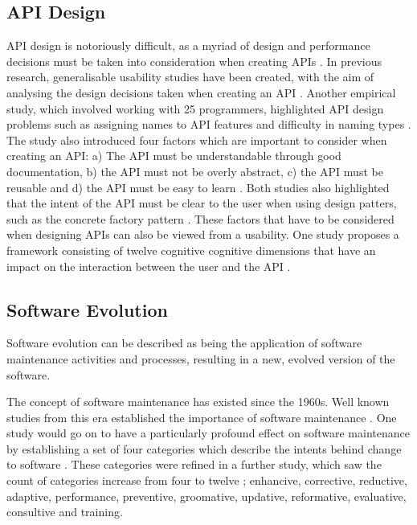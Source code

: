 \documentclass[10pt,twocolumn]{article}
\begin{document}
\subsection{API Design}
API design is notoriously difficult, as a myriad of design and performance decisions must be taken into consideration when creating APIs \cite{bloch2008effective} \cite{afonso2012evaluating} \cite{stylos2006comparing}. In previous research, generalisable usability studies have been created, with the aim of analysing the design decisions taken when creating an API \cite{stylos2006comparing}. Another empirical study, which involved working with 25 programmers, highlighted API design problems such as assigning names to API features and difficulty in naming types \cite{shi2011empirical}. The study also introduced four factors which are important to consider when creating an API: a) The API  must be understandable through good documentation, b) the API must not be overly abstract, c) the API must be reusable and d) the API must be easy to learn \cite{shi2011empirical}. Both studies also highlighted that the intent of the API must be clear to the user when using design patters, such as the concrete factory pattern \cite{shi2011empirical} \cite{stylos2006comparing}. These factors that have to be considered when designing APIs can also be viewed from a usability. One study proposes a framework consisting of twelve cognitive cognitive dimensions that have an impact on the interaction between the user and the API \cite{clarke2004measuring}. 


\subsection{Software Evolution}
Software evolution can be described as being the application of software maintenance activities and processes, resulting in a new, evolved version of the software.

The concept of software maintenance has existed since the 1960s. Well known studies from this era established the importance of software maintenance \cite{canning1972maintenance} \cite{lientz1980software}. One study would go on to have a particularly profound effect on software maintenance by establishing a set of four categories which describe the intents behind change to software \cite{lientz1980software}. These categories were refined in a further study, which saw the count of categories increase from four to twelve \cite{chapin2001types}; enhancive, corrective, reductive, adaptive, performance, preventive, groomative, updative, reformative, evaluative, consultive and training.
\end{document}
